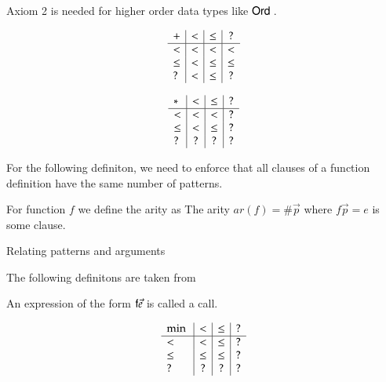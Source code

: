 Axiom 2 is needed for higher order data types like $\mathsf{Ord}\:$.

\begin{definition}
\[
\begin{array}{l | c |c | c }

 +    &  <   &  \leq   &  ? \\
 \hline 
 <    &  <   & <       &  <   \\
 \leq &  <   & \leq    &  \leq \\
 ?    &  <   & \leq    &  ?
\end{array}
\]

\end{definition}


\begin{definition}
\[
\begin{array}{l | c |c | c}
 *   &  <  &  \leq & ? \\
\hline
  <   & <    & <    &   ? \\
 \leq & <    & \leq &   ?  \\
 ?    & ?    & ?    &   ?
\end{array}
\]
\end{definition}

For the following definiton, we need to enforce that all clauses of a function definition have the same number of patterns.
\begin{definition}
For function $f$ we define the arity as The arity $ar(f) = \# \vec{p} $ where $f \vec{p} = e $ is some clause.   
\end{definition}

\begin{definition}{Relating patterns and arguments}
\end{definition}

The following definitons are taken from \cite{abelAltenkirch:predStRec}

\begin{definition}
An expression of the form $\mathsf{f} \vec{e}$ is called a call.
\end{definition}

\newcommand{\mino}{\mathrm{min}\:}
\newcommand{\maxo}{\mathrm{max}\:}
\newcommand{\supo}{\mathrm{sup}\:}
\newcommand{\info}{\mathrm{inf}\:}

\begin{definition}
\[
\begin{array}{l | c |c | c}
 \mino &  <      &  \leq    & ? \\
\hline
  <    & <       &  \leq    &   ? \\
 \leq  & \leq    &  \leq    &   ?  \\
 ?     & ?       &  ?       &   ?
\end{array}
\]
\end{definition}

